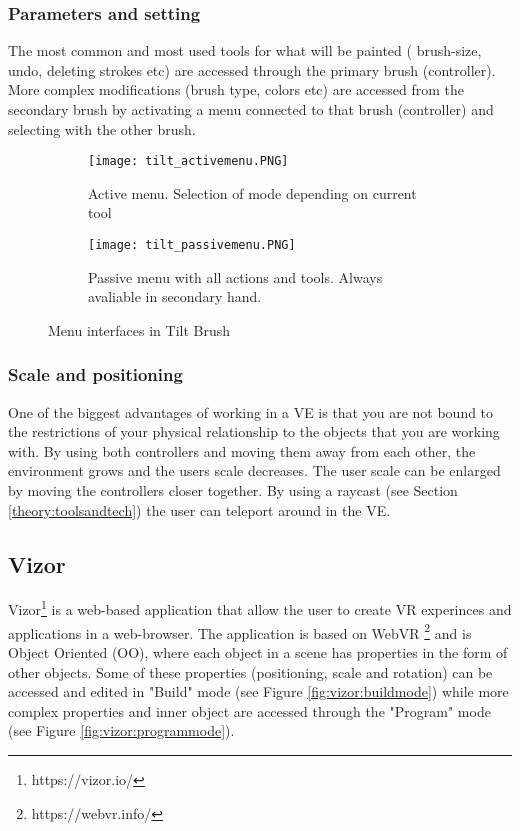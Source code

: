 \subsubsection{Parameters and setting}
The most common and most used tools for what will be painted ( brush-size, undo, deleting strokes etc) are accessed through the primary brush (controller). More complex modifications (brush type, colors etc) are accessed from the secondary brush by activating a menu connected to that brush (controller) and selecting with the other brush.
\begin{figure}
\begin{subfigure}{.5\textwidth}
  \centering
  \texttt{[image: tilt\_activemenu.PNG]}
  \caption{Active menu. Selection of mode depending on current tool}
  \label{fig:tilt:activemenu}
\end{subfigure}%
\begin{subfigure}{.5\textwidth}
  \centering
  \texttt{[image: tilt\_passivemenu.PNG]}
  \caption{Passive menu with all actions and tools. Always avaliable in secondary hand. }
  \label{fig:tilt:passivemenu}
\end{subfigure}
\caption{Menu interfaces in Tilt Brush}
\label{fig:tilt}
\end{figure}
\subsubsection{Scale and positioning}
One of the biggest advantages of working in a VE is that you are not bound to the restrictions of your physical relationship to the objects that you are working with. By using both controllers and moving them away from each other, the environment grows and the users scale decreases. The user scale can be enlarged by moving the controllers closer together.
By using a raycast (see Section \ref{theory:toolsandtech}) the user can teleport around in the VE.

\subsection{Vizor}
Vizor\footnote{https://vizor.io/} is a web-based application that allow the user to create VR experinces and applications in a web-browser. The application is based on WebVR \footnote{https://webvr.info/} and is Object Oriented (OO), where each object in a scene has properties in the form of other objects. Some of these properties (positioning, scale and rotation) can be accessed and edited in "Build" mode (see Figure \ref{fig:vizor:buildmode}) while more complex properties and inner object are accessed through the "Program" mode (see Figure \ref{fig:vizor:programmode}).

